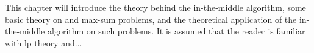 This chapter will introduce the theory behind the in-the-middle algorithm, some basic theory on  and max-sum problems, and the theoretical application of the in-the-middle algorithm on such problems.
It is assumed that the reader is familiar with \acrlong{lp} theory and...
